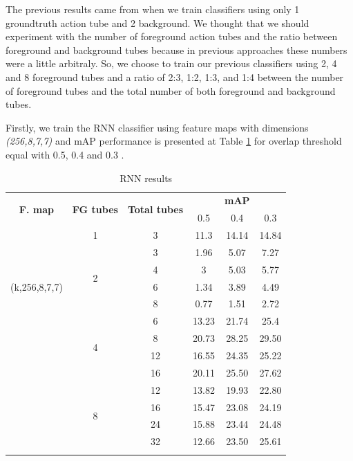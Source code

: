 \documentclass{report}
\begin{document}
The previous results came from when we train classifiers using only 1 groundtruth action tube and 2 background. We thought that we should
experiment with the number of foreground action tubes and the ratio between foreground and background tubes because in previous approaches
these numbers were a little arbitraly. So, we choose to train our previous classifiers using 2, 4 and 8 foreground tubes and a ratio of 2:3,
1:2, 1:3, and 1:4 between the number of foreground tubes and the total number of both foreground and background tubes. \par

Firstly, we train the RNN classifier using feature maps with dimensions \textit{(256,8,7,7)} and mAP performance is presented at Table 
\ref{table:rnn_increased} for overlap threshold equal with 0.5, 0.4 and 0.3 . 

\begin{center}
  \begin{longtable}{|| c | c | c || c c c||}
    \hline
    \multirow{2}{*}{\textbf{F. map}} & \multirow{2}{*}{\textbf{FG tubes}}  & \multirow{2}{*}{\textbf{Total tubes}} & {} & \textbf{mAP} & {} \\
    {}  & {} & {} & 0.5 & 0.4 & 0.3 \\
    \hline
    \multirow{7}{*}{(k,256,8,7,7)} & 1 & 3 & 11.3 & 14.14 & 14.84 \\
    \cline{2-6}
    {} & \multirow{4}{*}{2} & 3 & 1.96 & 5.07 & 7.27 \\
    \cline{3-6}
    {} & {} & 4  & 3 & 5.03 & 5.77 \\
    \cline{3-6}
    {} & {} & 6 & 1.34 & 3.89 & 4.49 \\
    \cline{3-6}
    {} & {} & 8 & 0.77 & 1.51 & 2.72 \\
    \cline{2-6}
    {} & \multirow{4}{*}{4} &  6 & 13.23 & 21.74 & 25.4 \\
    \cline{3-6}
    {} & {} & 8 & 20.73 & 28.25 & 29.50 \\
    \cline{3-6}
    {} & {} & 12  & 16.55 & 24.35 & 25.22 \\
    \cline{3-6}
    {} & {} & 16  & 20.11 & 25.50 & 27.62 \\
    \cline{2-6}
    {} & \multirow{4}{*}{8} & 12 & 13.82 & 19.93 & 22.80 \\
    \cline{3-6}
    {} &  {} & 16 & 15.47 & 23.08 & 24.19 \\
    \cline{3-6}
    {} &  {} & 24 & 15.88 & 23.44 & 24.48  \\
    \cline{3-6}
    {} &  {} & 32 &  12.66 & 23.50 & 25.61 \\
    \hline

  \caption{RNN results }
  \label{table:rnn_increased}
\end{longtable}
\end{center}
\end{document}
